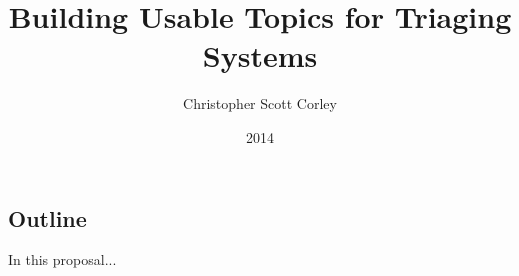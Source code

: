 \documentclass{AlabamaManuscript}
\author{Christopher Scott Corley} %
\title{Building Usable Topics for Triaging Systems}
\date{2014}
\begin{document}
\maketitle

\begin{abstract}

\end{abstract}
%
%

\tableofcontents
\listoftables
\listoffigures
\listofsymbols

\begin{body}

%

\section{Outline}
In this proposal...

%

\end{body}

\nocite{*}

\begin{appendices}

\end{appendices}
\end{document}
